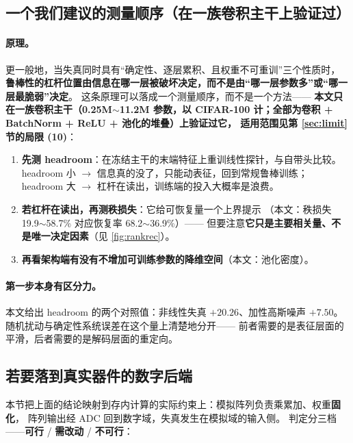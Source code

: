 \documentclass[11pt,a4paper]{ctexart}
\begin{document}
\subsection{一个我们建议的测量顺序（在一族卷积主干上验证过）}

\paragraph{原理。}
更一般地，当失真同时具有“确定性、逐层累积、且权重不可重训”三个性质时，
\textbf{鲁棒性的杠杆位置由信息在哪一层被破坏决定，而不是由“哪一层参数多”或“哪一层最脆弱”决定}。
这条原理可以落成一个测量顺序，而不是一个方法——
\textbf{本文只在一族卷积主干（0.25M$\sim$11.2M 参数，以 CIFAR-100 计；全部为卷积 + BatchNorm + ReLU + 池化的堆叠）上验证过它，
适用范围见第 \ref{sec:limit} 节的局限 (10)}：

\begin{enumerate}[leftmargin=2em,itemsep=2pt]
  \item \textbf{先测 headroom}：在冻结主干的末端特征上重训线性探针，与自带头比较。
        headroom 小 $\to$ 信息真的没了，只能动表征，回到常规鲁棒训练；
        headroom 大 $\to$ 杠杆在读出，训练端的投入大概率是浪费。
  \item \textbf{若杠杆在读出，再测秩损失}：它给可恢复量一个上界提示
        （本文：秩损失 19.9$\sim$58.7\% 对应恢复率 68.2$\sim$36.9\%）——
        但要注意\textbf{它只是主要相关量、不是唯一决定因素}（见 \cref{fig:rankrec}）。
  \item \textbf{再看架构端有没有不增加可训练参数的降维空间}（本文：池化密度）。
\end{enumerate}

\paragraph{第一步本身有区分力。}
本文给出 headroom 的两个对照值：非线性失真 $+20.26$、加性高斯噪声 $+7.50$。
随机扰动与确定性系统误差在这个量上清楚地分开——
前者需要的是表征层面的平滑，后者需要的是解码层面的重定向。

\subsection{若要落到真实器件的数字后端}
\label{sec:deploy}

本节把上面的结论映射到存内计算的实际约束上：模拟阵列负责乘累加、权重\textbf{固化}，
阵列输出经 ADC 回到数字域，失真发生在模拟域的输入侧。
判定分三档——\textbf{可行} / \textbf{需改动} / \textbf{不可行}：
\end{document}

